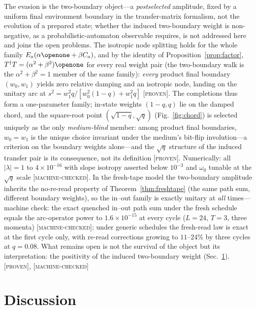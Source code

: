 \documentclass[aps,prd,twocolumn,superscriptaddress,nofootinbib,floatfix]{revtex4-2}
\newcommand{\evP}{\textnormal{\textsc{[proven]}}}
\newcommand{\evM}{\textnormal{\textsc{[machine-checked]}}}
\begin{document}
The evasion is the two-boundary object---a \emph{postselected}
amplitude, fixed by a uniform final environment boundary in the
transfer-matrix formalism, not the evolution of a prepared state;
whether the induced two-boundary weight is non-negative, as a
probabilistic-automaton observable requires, is not addressed here and
joins the open problems. The isotropic node splitting
holds for the whole family $E_a(\alpha\openone+\beta C_a)$, and by the
identity of Proposition~\ref{prop:factor},
$T^\dagger T=(\alpha^2+\beta^2)\openone$ for every real weight pair (the
two-boundary walk is the $\alpha^2+\beta^2=1$ member of the same
family): \emph{every} product final boundary
$(w_0,w_1)$ yields zero relative damping and an isotropic node, landing on
the unitary arc at $s^2=w_1^2q/[w_0^2(1-q)+w_1^2q]$ \evP{}. The
completions thus form a one-parameter family; in-state weights $(1-q,q)$
lie on the damped chord, and the square-root point
$(\sqrt{1-q},\sqrt q)$ (Fig.~\ref{fig:chord}) is selected uniquely as
the only \emph{medium-blind} member: among product final boundaries,
$w_0=w_1$ is the unique choice invariant under the medium's bit-flip
involution---a criterion on the boundary weights alone---and the
$\sqrt q$ structure of the induced transfer pair is its consequence,
not its definition \evP{}. Numerically: all
$|\lambda|=1$ to $4\times10^{-16}$ with slope isotropy asserted below
$10^{-3}$ and $\omega_0$ tunable at the $\sqrt q$ scale \evM{}. In
the fresh-tape model the two-boundary amplitude inherits the
no-re-read property of Theorem~\ref{thm:freshtape} (the same path sum,
different boundary weights), so the in--out family is exactly unitary
at \emph{all} times---machine check: the exact quenched in--out path
sum under the fresh schedule equals the arc-operator power to
$1.6\times10^{-15}$ at every cycle ($L=24$, $T=3$, three momenta)
\evM{}; under generic schedules the fresh-read law is
exact at the first cycle only, with re-read corrections growing to
$11$--$24\%$ by three cycles at $q=0.08$. What remains open is not the
survival of the object but its interpretation: the positivity of the
induced two-boundary weight (Sec.~\ref{sec:discussion}).
\evP{}, \evM{}

\section{Discussion}
\label{sec:discussion}
\end{document}
